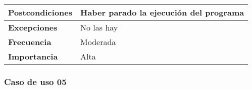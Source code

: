 \begin{longtable}{l|l}
\begin{minipage}{0.25\columnwidth}
\textbf{Postcondiciones} 
\end{minipage}
&
\begin{minipage}{0.65\columnwidth}
Haber parado la ejecución del programa
\end{minipage}
\\ \hline

\begin{minipage}{0.25\columnwidth}
\textbf{Excepciones} 
\end{minipage}
&
\begin{minipage}{0.65\columnwidth}
No las hay
\end{minipage}
\\ \hline

\begin{minipage}{0.25\columnwidth}
\textbf{Frecuencia} 
\end{minipage}
&
\begin{minipage}{0.65\columnwidth}
Moderada
\end{minipage}
\\ \hline

\begin{minipage}{0.25\columnwidth}
\textbf{Importancia} 
\end{minipage}
&
\begin{minipage}{0.65\columnwidth}
Alta
\end{minipage}
\\ \hline
\end{longtable}

\subsubsection{Caso de uso 05}

